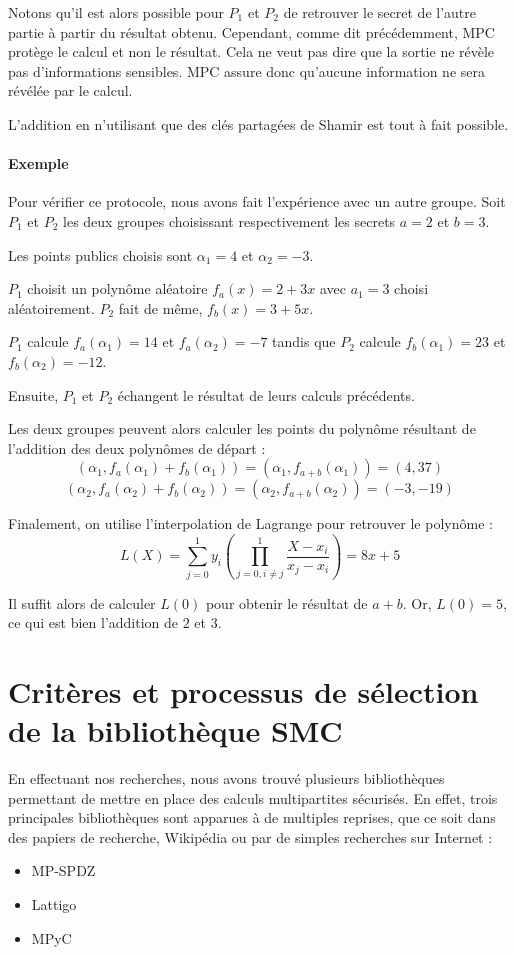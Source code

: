 \documentclass[12pt,a4paper]{article}
\begin{document}
Notons qu'il est alors possible pour $P_1$ et $P_2$ de retrouver le secret de l'autre partie à partir du résultat obtenu. Cependant, comme dit précédemment, MPC protège le calcul et non le résultat. Cela ne veut pas dire que la sortie ne révèle pas d’informations sensibles. MPC assure donc qu’aucune information ne sera révélée par le calcul.

L'addition en n'utilisant que des clés partagées de Shamir est tout à fait possible.

\paragraph{Exemple}
Pour vérifier ce protocole, nous avons fait l'expérience avec un autre groupe.
Soit $P_1$ et $P_2$ les deux groupes choisissant respectivement les secrets $a = 2$ et $b = 3$.

Les points publics choisis sont $\alpha_1 = 4$ et $\alpha_2 = -3$.

$P_1$ choisit un polynôme aléatoire $f_a(x) = 2 + 3x$ avec $a_1 = 3$ choisi aléatoirement. $P_2$ fait de même, $f_b(x) = 3 +5x$.

$P_1$ calcule $f_a(\alpha_1) = 14$ et $f_a(\alpha_2) = -7$ tandis que $P_2$ calcule $f_b(\alpha_1) = 23$ et $f_b(\alpha_2) = -12$.

Ensuite, $P_1$ et $P_2$ échangent le résultat de leurs calculs précédents.

Les deux groupes peuvent alors calculer les points du polynôme résultant de l'addition des deux polynômes de départ :
\[
    (\alpha_1, f_a(\alpha_1) + f_b(\alpha_1)) = (\alpha_1, f_{a + b}(\alpha_1)) = (4, 37)
\]
\[
    (\alpha_2, f_a(\alpha_2) + f_b(\alpha_2)) = (\alpha_2, f_{a + b}(\alpha_2)) = (-3, -19)
\]

Finalement, on utilise l'interpolation de Lagrange pour retrouver le polynôme :
\[
    L(X)=\sum_{j=0}^{1}y_i(\prod_{j=0,i\neq j}^1 \frac{X - x_i}{x_j - x_i}) = 8x + 5
\]

Il suffit alors de calculer $L(0)$ pour obtenir le résultat de $a + b$. Or, $L(0) = 5$, ce qui est bien l'addition de $2$ et $3$.

\section{Critères et processus de sélection de la bibliothèque SMC}
En effectuant nos recherches, nous avons trouvé plusieurs bibliothèques permettant de mettre en place des calculs multipartites sécurisés. En effet, trois principales bibliothèques sont apparues à de multiples reprises, que ce soit dans des papiers de recherche, Wikipédia ou par de simples recherches sur Internet :
\begin{itemize}
    \item MP-SPDZ \cite{mp-spdz}
    \item Lattigo \cite{lattigo}
    \item MPyC \cite{mpyc}\\
\end{itemize}
\end{document}
